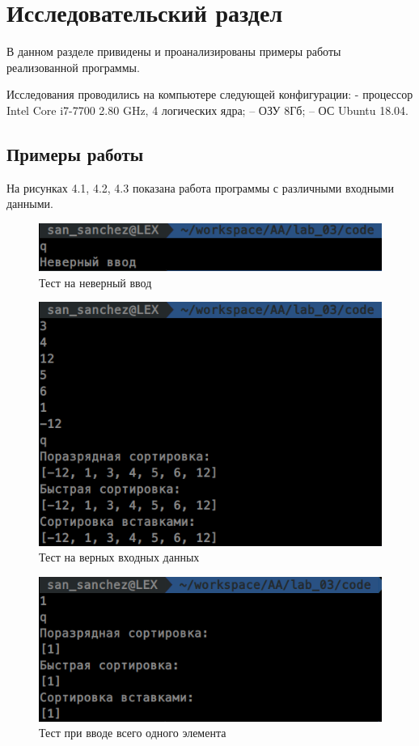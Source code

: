 \chapter{Исследовательский раздел}
\label{cha:research}

В данном разделе привидены и проанализированы примеры работы реализованной программы.


Исследования проводились на компьютере следующей конфигурации:
- процессор Intel Core i7-7700 2.80 GHz, 4 логических ядра;
– ОЗУ 8Гб;
– ОС Ubuntu 18.04.
\section{Примеры работы}

На рисунках 4.1, 4.2, 4.3 показана работа программы с различными входными данными.


\begin{figure}[H]
\centering
\includegraphics[scale=0.75]{./pictures/wrk2.png}
\caption{Тест на неверный ввод}
\end{figure}
\begin{figure}[H]
\centering
\includegraphics[scale=0.75]{./pictures/wrk3.png}
\caption{Тест на верных входных данных}
\end{figure}
\begin{figure}[H]
\centering
\includegraphics[scale=0.75]{./pictures/wrk5.png}
\caption{Тест при вводе всего одного элемента}
\end{figure}

